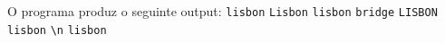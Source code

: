 \documentclass[12pt,varwidth=16cm,border=1pt]{standalone}
\begin{document}
O programa produz o seguinte output: 
\newline
\verb+lisbon+ \newline
\verb+Lisbon+ \newline
\verb+lisbon+ \verb+bridge+ \newline
\verb+LISBON+ \newline
\verb+lisbon+ \newline
\verb+\n+     \newline
\verb+lisbon+
\end{document}
